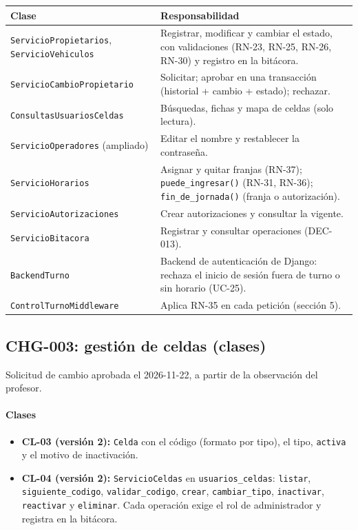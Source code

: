 \begin{longtable}{>{\raggedright\arraybackslash}p{5.0cm}>{\raggedright\arraybackslash}p{9.4cm}}
\toprule
\textbf{Clase} & \textbf{Responsabilidad}\\
\midrule\endhead
\texttt{ServicioPropietarios}, \texttt{ServicioVehiculos} & Registrar, modificar y cambiar el estado, con validaciones (RN-23, RN-25, RN-26, RN-30) y registro en la bitácora.\\
\texttt{ServicioCambioPropietario} & Solicitar; aprobar en una transacción (historial + cambio + estado); rechazar.\\
\texttt{ConsultasUsuariosCeldas} & Búsquedas, fichas y mapa de celdas (solo lectura).\\
\texttt{ServicioOperadores} (ampliado) & Editar el nombre y restablecer la contraseña.\\
\texttt{ServicioHorarios} & Asignar y quitar franjas (RN-37); \texttt{puede\_ingresar()} (RN-31, RN-36); \texttt{fin\_de\_jornada()} (franja o autorización).\\
\texttt{ServicioAutorizaciones} & Crear autorizaciones y consultar la vigente.\\
\texttt{ServicioBitacora} & Registrar y consultar operaciones (DEC-013).\\
\texttt{BackendTurno} & Backend de autenticación de Django: rechaza el inicio de sesión fuera de turno o sin horario (UC-25).\\
\texttt{ControlTurnoMiddleware} & Aplica RN-35 en cada petición (sección 5).\\
\bottomrule
\end{longtable}




\subsection{CHG-003: gestión de celdas (clases)}
Solicitud de cambio aprobada el 2026-11-22, a partir de la observación del profesor.

\paragraph{Clases}

\begin{itemize}
  \item \textbf{CL-03 (versión 2):} \texttt{Celda} con el código (formato por tipo), el tipo, \texttt{activa} y el motivo de inactivación.
  \item \textbf{CL-04 (versión 2):} \texttt{ServicioCeldas} en \texttt{usuarios\_celdas}: \texttt{listar}, \texttt{siguiente\_codigo}, \texttt{validar\_codigo}, \texttt{crear}, \texttt{cambiar\_tipo}, \texttt{inactivar}, \texttt{reactivar} y \texttt{eliminar}. Cada operación exige el rol de administrador y registra en la bitácora.
\end{itemize}


